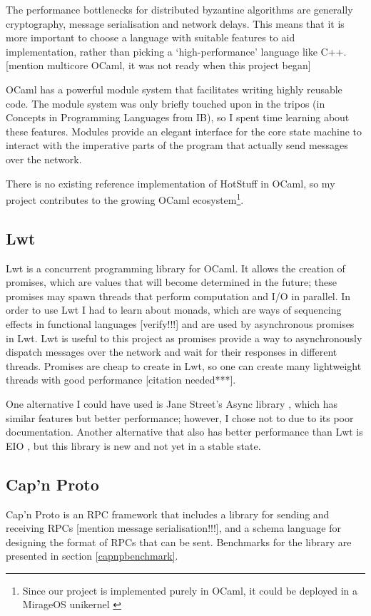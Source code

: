 The performance bottlenecks for distributed byzantine algorithms are generally cryptography, message serialisation and network delays. This means that it is more important to choose a language with suitable features to aid implementation, rather than picking a `high-performance' language like C++. [mention multicore OCaml, it was not ready when this project began]

OCaml has a powerful module system that facilitates writing highly reusable code. The module system was only briefly touched upon in the tripos (in Concepts in Programming Languages from IB), so I spent time learning about these features. Modules provide an elegant interface for the core state machine to interact with the imperative parts of the program that actually send messages over the network.

There is no existing reference implementation of HotStuff in OCaml, so my project contributes to the growing OCaml ecosystem\footnote{Since our project is implemented purely in OCaml, it could be deployed in a MirageOS unikernel \cite{noauthor_mirageos_nodate}}.

\subsection{Lwt}
Lwt \cite{noauthor_lwt_2023} is a concurrent programming library for OCaml. It allows the creation of promises, which are values that will become determined in the future; these promises may spawn threads that perform computation and I/O in parallel. In order to use Lwt I had to learn about monads, which are ways of sequencing effects in functional languages [verify!!!] and are used by asynchronous promises in Lwt. Lwt is useful to this project as promises provide a way to asynchronously dispatch messages over the network and wait for their responses in different threads. Promises are cheap to create in Lwt, so one can create many lightweight threads with good performance [citation needed***].

One alternative I could have used is Jane Street's Async library \cite{noauthor_async_nodate}, which has similar features but better performance; however, I chose not to due to its poor documentation. Another alternative that also has better performance than Lwt is EIO \cite{noauthor_eio_2023}, but this library is new and not yet in a stable state.

\subsection{Cap'n Proto}
Cap'n Proto  \cite{noauthor_capn_nodate} is an RPC framework that includes a library for sending and receiving RPCs [mention message serialisation!!!], and a schema language for designing the format of RPCs that can be sent. Benchmarks for the library are presented in section \ref{capnpbenchmark}.

